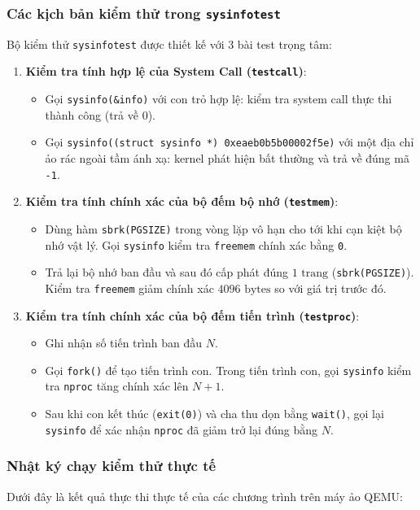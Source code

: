 \subsubsection{Các kịch bản kiểm thử trong \texttt{sysinfotest}}
Bộ kiểm thử \texttt{sysinfotest} được thiết kế với 3 bài test trọng tâm:
\begin{enumerate}
    \item \textbf{Kiểm tra tính hợp lệ của System Call (\texttt{testcall})}:
    \begin{itemize}
        \item Gọi \texttt{sysinfo(\&info)} với con trỏ hợp lệ: kiểm tra system call thực thi thành công (trả về 0).
        \item Gọi \texttt{sysinfo((struct sysinfo *) 0xeaeb0b5b00002f5e)} với một địa chỉ ảo rác ngoài tầm ánh xạ: kernel phát hiện bất thường và trả về đúng mã \texttt{-1}.
    \end{itemize}
    \item \textbf{Kiểm tra tính chính xác của bộ đếm bộ nhớ (\texttt{testmem})}:
    \begin{itemize}
        \item Dùng hàm \texttt{sbrk(PGSIZE)} trong vòng lặp vô hạn cho tới khi cạn kiệt bộ nhớ vật lý. Gọi \texttt{sysinfo} kiểm tra \texttt{freemem} chính xác bằng \texttt{0}.
        \item Trả lại bộ nhớ ban đầu và sau đó cấp phát đúng $1\text{ trang}$ (\texttt{sbrk(PGSIZE)}). Kiểm tra \texttt{freemem} giảm chính xác $4096\text{ bytes}$ so với giá trị trước đó.
    \end{itemize}
    \item \textbf{Kiểm tra tính chính xác của bộ đếm tiến trình (\texttt{testproc})}:
    \begin{itemize}
        \item Ghi nhận số tiến trình ban đầu $N$.
        \item Gọi \texttt{fork()} để tạo tiến trình con. Trong tiến trình con, gọi \texttt{sysinfo} kiểm tra \texttt{nproc} tăng chính xác lên $N + 1$.
        \item Sau khi con kết thúc (\texttt{exit(0)}) và cha thu dọn bằng \texttt{wait()}, gọi lại \texttt{sysinfo} để xác nhận \texttt{nproc} đã giảm trở lại đúng bằng $N$.
    \end{itemize}
\end{enumerate}

\subsubsection{Nhật ký chạy kiểm thử thực tế}
Dưới đây là kết quả thực thi thực tế của các chương trình trên máy ảo QEMU:

